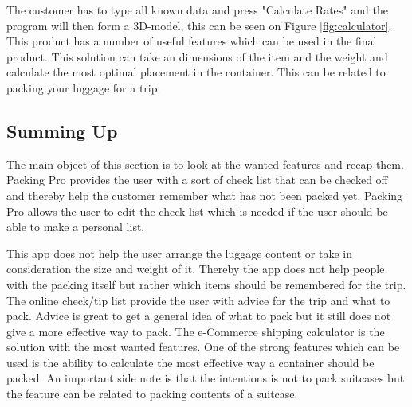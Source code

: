 
The customer has to type all known data and press "Calculate Rates" and the program will then form a 3D-model, this can be seen on Figure \ref{fig:calculator}.
This product has a number of useful features which can be used in the final product. This solution can take an dimensions of the item and the weight and calculate the most optimal placement in the container. This can be related to packing your luggage for a trip.

\subsection{Summing Up}

The main object of this section is to look at the wanted features and recap them.
Packing Pro provides the user with a sort of check list that can be checked off and thereby help the customer remember what has not been packed yet.
Packing Pro allows the user to edit the check list which is needed if the user should be able to make a personal list.

This app does not help the user arrange the luggage content or take in consideration the size and weight of it. Thereby the app does not help people with the packing itself but rather which items should be remembered for the trip.
The online check/tip list provide the user with advice for the trip and what to pack. Advice is great to get a general idea of what to pack but it still does not give a more effective way to pack.
The e-Commerce shipping calculator is the solution with the most wanted features. One of the strong features which can be used is the ability to calculate the most effective way a container should be packed. An important side note is that the intentions is not to pack suitcases but the feature can be related to packing contents of a suitcase.

